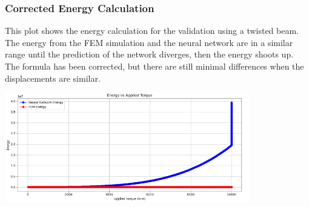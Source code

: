 \documentclass{beamer}
\begin{document}
\begin{frame}
    \frametitle{ Corrected Energy Calculation}
    This plot shows the energy calculation for the validation using a twisted beam. The energy from the FEM simulation and the neural network are in a similar range until the prediction of the network diverges, then the energy shoots up. The formula has been corrected, but there are still minimal differences when the displacements are similar. 
    \begin{center}
        \includegraphics[width=0.8\textwidth]{Images/fem_vs_nn_energy.png}
    \end{center}
   
\end{frame}

            
                
                
                
\end{document}
